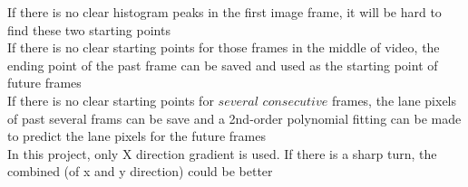 \documentclass[11pt]{article}
\begin{document}
If there is no clear histogram peaks in the first image frame, it will
be hard to find these two starting points\\
If there is no clear starting points for those frames in the middle of
video, the ending point of the past frame can be saved and used as the
starting point of future frames\\
If there is no clear starting points for \(several\) \(consecutive\)
frames, the lane pixels of past several frams can be save and a
2nd-order polynomial fitting can be made to predict the lane pixels for
the future frames\\
In this project, only X direction gradient is used. If there is a sharp
turn, the combined (of x and y direction) could be better


    
    
    
    
\end{document}
